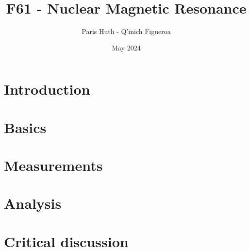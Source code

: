 \documentclass{article}
\title{F61 - Nuclear Magnetic Resonance}
\author{Paris Huth - Q'inich Figueroa}
\date{May 2024}
\begin{document}
\maketitle

\section{Introduction}
\section{Basics}
\section{Measurements}
\section{Analysis}
\section{Critical discussion}
\end{document}

